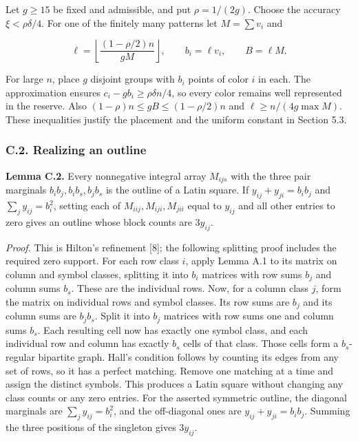 \documentclass[english,11pt,a4paper]{article}
\begin{document}
Let \(g\ge15\) be fixed and admissible, and put \(\rho=1/(2g)\). Choose the accuracy \(\xi<\rho\delta/4\). For one of the finitely many patterns let \(M=\sum v_i\) and

\[\ell=\left\lfloor\frac{(1-\rho/2)n}{gM}\right\rfloor,\qquad b_i=\ell v_i,\qquad B=\ell M.\]

For large \(n\), place \(g\) disjoint groups with \(b_i\) points of color \(i\) in each. The approximation ensures \(c_i-gb_i\ge\rho\delta n/4\), so every color remains well represented in the reserve. Also \((1-\rho)n\le gB\le(1-\rho/2)n\) and \(\ell\ge n/(4g\max M)\). These inequalities justify the placement and the uniform constant in Section 5.3.

\subsubsection{C.2. Realizing an outline}\label{c.2.-realizing-an-outline}

\textbf{Lemma C.2.} Every nonnegative integral array \(M_{ijs}\) with the three pair marginals \(b_ib_j,b_ib_s,b_jb_s\) is the outline of a Latin square. If \(y_{ij}+y_{ji}=b_ib_j\) and \(\sum_jy_{ij}=b_i^2\), setting each of \(M_{iij},M_{iji},M_{jii}\) equal to \(y_{ij}\) and all other entries to zero gives an outline whose block counts are \(3y_{ij}\).

\emph{Proof.} This is Hilton's refinement {[}8{]}; the following splitting proof includes the required zero support. For each row class \(i\), apply Lemma A.1 to its matrix on column and symbol classes, splitting it into \(b_i\) matrices with row sums \(b_j\) and column sums \(b_s\). These are the individual rows. Now, for a column class \(j\), form the matrix on individual rows and symbol classes. Its row sums are \(b_j\) and its column sums are \(b_jb_s\). Split it into \(b_j\) matrices with row sums one and column sums \(b_s\). Each resulting cell now has exactly one symbol class, and each individual row and column has exactly \(b_s\) cells of that class. Those cells form a \(b_s\)-regular bipartite graph. Hall's condition follows by counting its edges from any set of rows, so it has a perfect matching. Remove one matching at a time and assign the distinct symbols. This produces a Latin square without changing any class counts or any zero entries. For the asserted symmetric outline, the diagonal marginals are \(\sum_jy_{ij}=b_i^2\), and the off-diagonal ones are \(y_{ij}+y_{ji}=b_ib_j\). Summing the three positions of the singleton gives \(3y_{ij}\).
\end{document}

